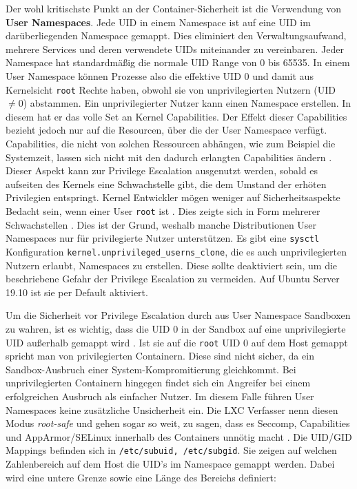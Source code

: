 Der wohl kritischste Punkt an der Container-Sicherheit ist die Verwendung von \textbf{User Namespaces}. Jede UID in einem Namespace ist auf eine UID im darüberliegenden Namespace gemappt. Dies eliminiert den Verwaltungsaufwand, mehrere Services und deren verwendete UIDs miteinander zu vereinbaren.
Jeder Namespace hat standardmäßig die normale UID Range von 0 bis 65535. In einem User Namespace können Prozesse also die effektive UID 0 und damit aus Kernelsicht \texttt{root} Rechte haben, obwohl sie von unprivilegierten Nutzern (UID $\neq 0$) abstammen. Ein unprivilegierter Nutzer kann einen Namespace erstellen. In diesem hat er das volle Set an Kernel Capabilities. Der Effekt dieser Capabilities bezieht jedoch nur auf die Resourcen, über die der User Namespace verfügt. Capabilities, die
nicht von solchen Ressourcen abhängen, wie zum Beispiel die Systemzeit, lassen sich nicht mit den dadurch erlangten Capabilities ändern \cite{man-user-ns}.
Dieser Aspekt kann zur Privilege Escalation ausgenutzt werden, sobald es aufseiten des Kernels eine Schwachstelle gibt, die dem Umstand der erhöten Privilegien entspringt. Kernel Entwickler mögen weniger auf Sicherheitsaspekte Bedacht sein, wenn einer User \texttt{root} ist \cite{kerrisk-anatomy}. Dies zeigte
sich in Form mehrerer Schwachstellen \cite{cve-2013-1858, cve-2014-5206, cve-2014-5207, cve-2017-1000111}. Dies ist der Grund, weshalb manche Distributionen User Namespaces nur für privilegierte Nutzer unterstützen. Es gibt eine \texttt{sysctl} Konfiguration \texttt{kernel.unprivileged\_userns\_clone}, die es auch unprivilegierten Nutzern erlaubt, Namespaces zu erstellen. Diese sollte deaktiviert sein, um die beschriebene Gefahr der Privilege Escalation
zu vermeiden. Auf Ubuntu Server 19.10 ist sie per Default aktiviert.

Um die Sicherheit vor Privilege Escalation durch aus User Namespace Sandboxen zu wahren, ist es wichtig, dass die UID 0 in der Sandbox auf eine unprivilegierte UID außerhalb gemappt wird \cite{lxc-sec, stgraber-unpriv}. Ist sie auf die \texttt{root} UID 0 auf dem Host gemappt spricht man von privilegierten Containern. Diese sind nicht sicher, da ein Sandbox-Ausbruch einer System-Kompromitierung gleichkommt.
Bei unprivilegierten Containern hingegen findet sich ein Angreifer bei einem erfolgreichen Ausbruch als einfacher Nutzer. Im diesem Falle führen User Namespaces keine zusätzliche Unsicherheit ein. Die LXC Verfasser nenn diesen Modus \textit{root-safe} und gehen sogar so weit, zu sagen, dass es Seccomp, Capabilities und AppArmor/SELinux innerhalb des Containers unnötig macht \cite{lxc-sec}. Die UID/GID Mappings befinden sich in \texttt{/etc/subuid, /etc/subgid}. Sie zeigen auf welchen
Zahlenbereich auf dem Host die UID's im Namespace gemappt werden. Dabei wird eine untere Grenze sowie eine Länge des Bereichs definiert:

